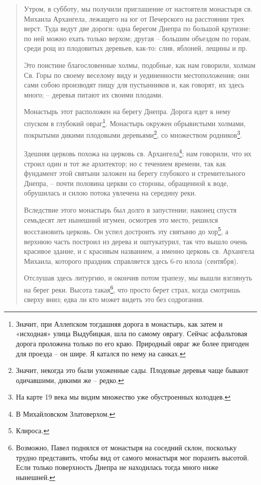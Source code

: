 \begin{quotation}  
Утром, в субботу, мы получили приглашение от настоятеля монастыря св. Михаила Архангела, лежащего на юг от Печерского на расстоянии трех верст. Туда ведут две дороги: одна берегом Днепра по большой крутизне: по ней можно ехать только верхом; другая – большим объездом по горам, среди рощ из плодовитых деревьев, как-то: слив, яблоней, лещины и пр. 

Это поистине благословенные холмы, подобные, как нам говорили, холмам Св. Горы по своему веселому виду и уединенности местоположения; они сами собою производят пищу для пустынников и, как говорят, их здесь много; – деревья питают их своими плодами.

Монастырь этот расположен на берегу Днепра. Дорога идет к нему спуском в глубокий овраг\footnote{Значит, при Аллепском тогдашняя дорога в монастырь, как затем и «исходная» улица Выдубицкая, шла по самому оврагу. Сейчас асфальтовая дорога проложена только по его краю. Природный овраг же более пригоден для проезда – он шире. Я катался по нему на санках.}. Монастырь окружен обрывистыми холмами, покрытыми дикими плодовыми деревьями\footnote{Значит, некогда это были ухоженные сады. Плодовые деревья чаще бывают одичавшими, дикими же – редко.}, со множеством родников\footnote{На карте 19 века мы видим множество уже обустроенных колодцев.}.

Здешняя церковь похожа на церковь св. Архангела\footnote{В Михайловском Златоверхом.}; нам говорили, что их строил один и тот же архитектор; но с течением времени, так как фундамент этой святыни заложен на берегу глубокого и стремительного Днепра, – почти половина церкви со стороны, обращенной к воде, обрушилась и силою потока увлечена на середину реки.

Вследствие этого монастырь был долго в запустении; наконец спустя семьдесят лет нынешний игумен, осмотрев это место, решился восстановить церковь. Он успел достроить эту святыню до хор\footnote{Клироса.}, а верхнюю часть построил из дерева и оштукатурил, так что вышло очень красивое здание, и с красивым названием, а именно церковь св. Архангела Михаила, которого праздник справляется здесь 6-го илола (сентября).

Отслушав здесь литургию, и окончив потом трапезу, мы вышли взглянуть на берег реки. Высота такая\footnote{Возможно, Павел поднялся от монастыря на соседний склон, поскольку трудно представить, чтобы вид от самого монастыря мог поразить высотой. Если только поверхность Днепра не находилась тогда много ниже нынешней.}, что просто берет страх, когда смотришь сверху вниз; едва ли кто может видеть это без содрогания.
\end{quotation}  
 
